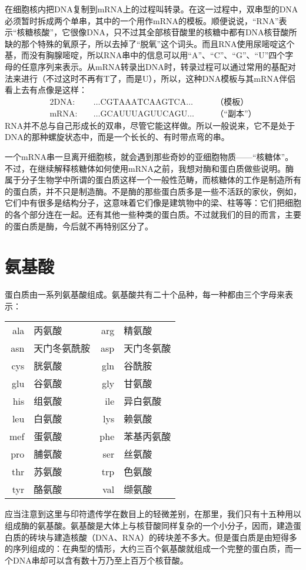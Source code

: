 在细胞核内把DNA复制到mRNA上的过程叫转录。在这一过程中，双串型的DNA必须暂时拆成两个单串，其中的一个用作mRNA的模板。顺便说说，“RNA”表示“核糖核酸”，它很像DNA，只不过其全部核苷酸里的核糖中都有DNA核苷酸所缺的那个特殊的氧原子，所以去掉了“脱氧”这个词头。而且RNA使用尿嘧啶这个基，而没有胸腺嘧啶，所以RNA串中的信息可以用“A”、“C”、“G”、“U”四个字母的任意序列来表示。从mRNA转录出DNA时，转录过程可以通过常用的基配对法来进行（不过这时不再有T了，而是U），所以，这种DNA模板与其mRNA伴侣看上去有点像是这样：
\begin{alignat*}{2}
\mathrm{DNA}:&\quad\dotsc\mathrm{CGTAAATCAAGTCA}\dotsc  &\quad&\text{（模板）}\\
\mathrm{mRNA}:&\quad\dotsc\mathrm{GCAUUUAGUUCAGU}\dotsc &     &\text{（“副本”）}
\end{alignat*}
RNA并不总与自己形成长的双串，尽管它能这样做。所以一般说来，它不是处于DNA的那种螺旋状态中，而是一个长长的、有时带点弯的串。

一个mRNA串一旦离开细胞核，就会遇到那些奇妙的亚细胞物质——“核糖体”。不过，在继续解释核糖体如何使用mRNA之前，我想对酶和蛋白质做些说明。酶属于分子生物学中所谓的蛋白质这样一个一般性范畴，而核糖体的工作是制造所有的蛋白质，并不只是制造酶。不是酶的那些蛋白质多是一些不活跃的家伙，例如，它们中有很多是结构分子，这意味着它们像是建筑物中的梁、柱等等：它们把细胞的各个部分连在一起。还有其他一些种类的蛋白质。不过就我们的目的而言，主要的蛋白质是酶，今后就不再特别区分了。

\section{氨基酸}

蛋白质由一系列氨基酸组成。氨基酸共有二十个品种，每一种都由三个字母来表示：
\begin{longtable}[c]{r!{——}l!{\qquad}r!{——}l}
ala & 丙氨酸 &
arg & 精氨酸\\
asn & 天门冬氨酰胺 &
asp & 天门冬氨酸\\
cys & 胱氨酸 &
gln & 谷酰胺\\
glu & 谷氨酸 &
gly & 甘氨酸\\
his & 组氨酸 &
ile & 异白氨酸\\
leu & 白氨酸 &
lys & 赖氨酸\\
mef & 蛋氨酸 &
phe & 苯基丙氨酸\\
pro & 脯氨酸 &
ser & 丝氨酸\\
thr & 苏氨酸 &
trp & 色氨酸\\
tyr & 酪氨酸 &
val & 缬氨酸
\end{longtable}
应当注意到这里与印符遗传学在数目上的轻微差别，在那里，我们只有十五种用以组成酶的氨基酸。氨基酸是大体上与核苷酸同样复杂的一个小分子，因而，建造蛋白质的砖块与建造核酸（DNA、RNA）的砖块差不多大。但是蛋白质是由短得多的序列组成的：在典型的情形，大约三百个氨基酸就组成一个完整的蛋白质，而一个DNA串却可以含有数十万乃至上百万个核苷酸。

